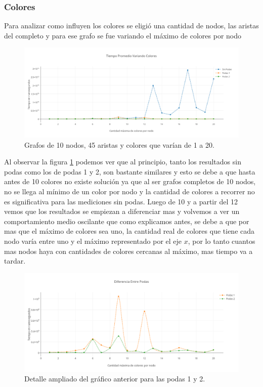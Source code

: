 \subsubsection{Colores}

 Para analizar como influyen los colores se eligió una cantidad de nodos, las aristas del completo y para ese grafo se fue variando el máximo de colores por nodo

 \begin{figure}[H]
	\centering
 	\includegraphics[scale=0.45]{imagenes/Ej2/Colores.png}
	\caption{Grafos de 10 nodos, 45 aristas y colores que varían de 1 a 20.}
	\label{colores}
 \end{figure}

Al observar la figura \ref{colores} podemos ver que al principio, tanto los resultados sin podas como los de podas 1 y 2, son bastante similares y esto se debe a que hasta antes de 10 colores no existe solución ya que al ser grafos completos de 10 nodos, no se llega al mínimo de un color por nodo y la cantidad de colores a recorrer no es significativa para las mediciones sin podas. Luego de 10 y a partir del 12 vemos que los resultados se empiezan a diferenciar mas y volvemos a ver un comportamiento medio oscilante que como explicamos antes, se debe a que por mas que el máximo de colores sea uno, la cantidad real de colores que tiene cada nodo varía entre uno y el máximo representado por el eje $x$, por lo tanto cuantos mas nodos haya con cantidades de colores cercanas al máximo, mas tiempo va a tardar.

 \begin{figure}[H]
	\centering
 	\includegraphics[scale=0.45]{imagenes/Ej2/ColoresPodas.png}
	\caption{Detalle ampliado del gráfico anterior para las podas 1 y 2.}
	\label{coloresP}
 \end{figure}

